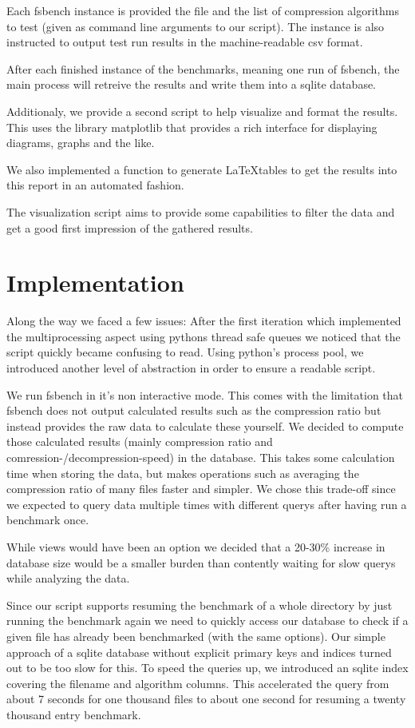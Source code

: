 \documentclass[
	12pt,
	a4paper,
	BCOR10mm,
	DIV14,
	listof=totoc,
	bibliography=totoc,
	headsepline
]{scrreprt}
\begin{document}
Each fsbench instance is provided the file and the list of compression algorithms to test (given as command line arguments to our script). The instance is also instructed to output test run results in the machine-readable csv format.

After each finished instance of the benchmarks, meaning one run of fsbench, the main process will retreive the results and write them into a sqlite database.

Additionaly, we provide a second script to help visualize and format the results. 
This uses the library matplotlib that provides a rich interface for displaying diagrams, graphs and the like.

We also implemented a function to generate \LaTeX tables to get the results into this report in an automated fashion.

The visualization script aims to provide some capabilities to filter the data and get a good first impression of the gathered results.

\section{Implementation}

Along the way we faced a few issues: After the first iteration which implemented the multiprocessing aspect using pythons thread safe queues we noticed that the script quickly became confusing to read. Using python's process pool, we introduced another level of abstraction in order to ensure a readable script.

We run fsbench in it's non interactive mode. This comes with the limitation that fsbench does not output calculated results such as the compression ratio but instead provides the raw data to calculate these yourself. We decided to compute those calculated results (mainly compression ratio and comression-/decompression-speed) in the database. This takes some calculation time when storing the data, but makes operations such as averaging the compression ratio of many files faster and simpler. We chose this trade-off since we expected to query data multiple times with different querys after having run a benchmark once.

While views would have been an option we decided that a 20-30\% increase in database size would be a smaller burden than contently waiting for slow querys while analyzing the data.

Since our script supports resuming the benchmark of a whole directory by just running the benchmark again we need to quickly access our database to check if a given file has already been benchmarked (with the same options). Our simple approach of a sqlite database without explicit primary keys and indices turned out to be too slow for this.
To speed the queries up, we introduced an sqlite index covering the filename and algorithm columns. This accelerated the query from about 7 seconds for one thousand files to about one second for resuming a twenty thousand entry benchmark.
\end{document}
